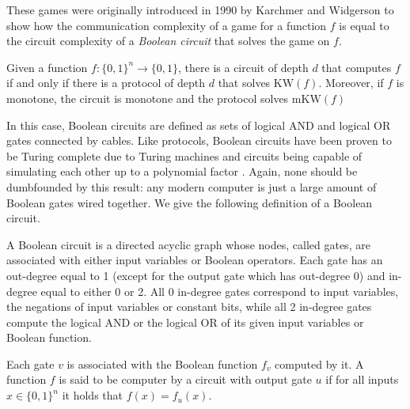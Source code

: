 These games were originally introduced in 1990 by Karchmer and Widgerson \cite{kw_games} to show how the communication complexity of a game for a function $f$ is equal to the circuit complexity of a \textit{Boolean circuit} that solves the game on $f$.

\begin{theorem}
 Given a function $f : \{0, 1\}^n \to \{0, 1\}$, there is a circuit of depth $d$ that computes $f$ if and only if there is a protocol of depth $d$ that solves $\mathrm{KW}(f)$. Moreover, if $f$ is monotone, the circuit is monotone and the protocol solves $\mathrm{mKW}(f)$
\end{theorem}

In this case, Boolean circuits are defined as sets of logical AND and logical OR gates connected by cables. Like protocols, Boolean circuits have been proven to be Turing complete due to Turing machines and circuits being capable of simulating each other up to a polynomial factor \cite{sipser_computation}. Again, none should be dumbfounded by this result: any modern computer is just a large amount of Boolean gates wired together. We give the following definition of a Boolean circuit. \cite{comm_compl_appl}

\begin{definition}
 A Boolean circuit is a directed acyclic graph whose nodes, called gates, are associated with either input variables or Boolean operators. Each gate has an out-degree equal to 1 (except for the output gate which has out-degree 0) and in-degree equal to either 0 or 2. All 0 in-degree gates correspond to input variables, the negations of input variables or constant bits, while all 2 in-degree gates compute the logical AND or the logical OR of its given input variables or Boolean function. 
\end{definition}

Each gate $v$ is associated with the Boolean function $f_v$ computed by it. A function $f$ is said to be computer by a circuit with output gate $u$ if for all inputs $x \in \{0,1\}^n$ it holds that $f(x) =  f_u(x)$.


